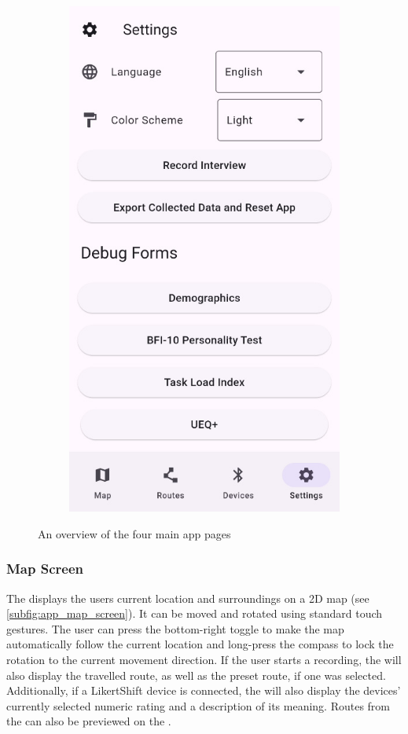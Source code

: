 \begin{figure}[!htb]
\begin{subfigure}{.25\textwidth}
        \includegraphics[width=.8666\linewidth]{images/app_settings_screen.jpg}
        \caption{\settingsscreen}
        \label{subfig:app_settings_screen}
    \end{subfigure}
    \caption{An overview of the four main app pages}
\end{figure}

\subsubsection*{Map Screen}

The \mapscreen displays the users current location and surroundings on a 2D map (see \autoref{subfig:app_map_screen}).
It can be moved and rotated using standard touch gestures.
The user can press the bottom-right toggle to make the map automatically follow the current location and long-press the compass to lock the rotation to the current movement direction.
If the user starts a recording, the \mapscreen will also display the travelled route, as well as the preset route, if one was selected.
Additionally, if a LikertShift device is connected, the \mapscreen will also display the devices' currently selected numeric rating and a description of its meaning.
Routes from the \routesscreen can also be previewed on the \mapscreen.


